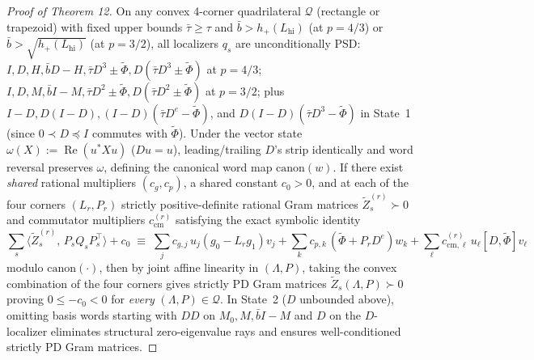 \documentclass[10pt,letterpaper]{article}
\begin{document}
\begin{proof}[Proof of Theorem 12]
On any convex 4-corner quadrilateral $\mathcal{Q}$ (rectangle or trapezoid) with fixed upper bounds $\bar{\tau} \ge \tau$ and $\bar{b} > h_+(L_{\mathrm{hi}})$ (at $p = 4/3$) or $\bar{b} > \sqrt{h_+(L_{\mathrm{hi}})}$ (at $p = 3/2$), all localizers $q_s$ are unconditionally PSD: $I, D, H, \bar{b}D-H, \bar{\tau}D^3 \pm \widetilde{\Phi}, D(\bar{\tau}D^3 \pm \widetilde{\Phi})$ at $p = 4/3$; $I, D, M, \bar{b}I-M, \bar{\tau}D^2 \pm \widetilde{\Phi}, D(\bar{\tau}D^2 \pm \widetilde{\Phi})$ at $p = 3/2$; plus $I-D, D(I-D), (I-D)(\bar{\tau}D^e - \widetilde{\Phi})$, and $D(I-D)(\bar{\tau}D^3 - \widetilde{\Phi})$ in State~1 (since $0 \prec D \preceq I$ commutes with $\widetilde{\Phi}$). Under the vector state $\omega(X) := \operatorname{Re}(u^* X u)$ ($Du = u$), leading/trailing $D$'s strip identically and word reversal preserves $\omega$, defining the canonical word map $\mathrm{canon}(w)$. If there exist \emph{shared} rational multipliers $(c_g, c_p)$, a shared constant $c_0 > 0$, and at each of the four corners $(L_r, P_r)$ strictly positive-definite rational Gram matrices $\widetilde{Z}_s^{(r)} \succ 0$ and commutator multipliers $c_{\mathrm{cm}}^{(r)}$ satisfying the exact symbolic identity
\[
  \sum_s \langle \widetilde{Z}_s^{(r)},\, P_s Q_s P_s^\top \rangle + c_0
  \;\equiv\;
  \sum_j c_{g,j}\, u_j (g_0 - L_r g_1) v_j
  + \sum_k c_{p,k}\, (\widetilde{\Phi} + P_r D^e) w_k
  + \sum_\ell c_{\mathrm{cm},\ell}^{(r)}\, u_\ell [D, \widetilde{\Phi}] v_\ell
\]
modulo $\mathrm{canon}(\cdot)$, then by joint affine linearity in $(\Lambda, P)$, taking the convex combination of the four corners gives strictly PD Gram matrices $\widetilde{Z}_s(\Lambda, P) \succ 0$ proving $0 \le -c_0 < 0$ for \emph{every} $(\Lambda, P) \in \mathcal{Q}$. In State~2 ($D$ unbounded above), omitting basis words starting with $DD$ on $M_0, M, \bar{b}I - M$ and $D$ on the $D$-localizer eliminates structural zero-eigenvalue rays and ensures well-conditioned strictly PD Gram matrices.


\end{proof}
\end{document}
